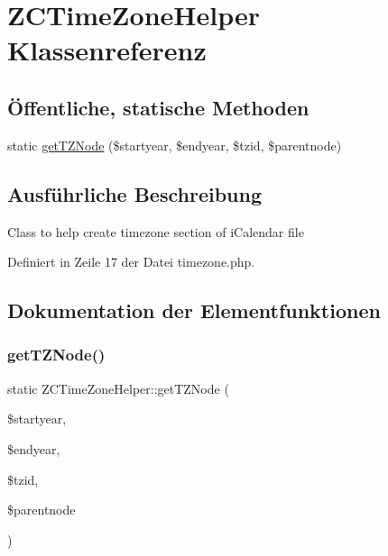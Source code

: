 \hypertarget{class_z_c_time_zone_helper}{}\section{Z\+C\+Time\+Zone\+Helper Klassenreferenz}
\label{class_z_c_time_zone_helper}
\subsection*{Öffentliche, statische Methoden}
\begin{DoxyCompactItemize}
\item 
static \mbox{\hyperlink{class_z_c_time_zone_helper_aec740d528e2da62a6a9781fa4f85208e}{get\+T\+Z\+Node}} (\$startyear, \$endyear, \$tzid, \$parentnode)
\end{DoxyCompactItemize}


\subsection{Ausführliche Beschreibung}
Class to help create timezone section of i\+Calendar file 

Definiert in Zeile 17 der Datei timezone.\+php.



\subsection{Dokumentation der Elementfunktionen}
\mbox{\label{class_z_c_time_zone_helper_aec740d528e2da62a6a9781fa4f85208e}} 
\subsubsection{\texorpdfstring{get\+T\+Z\+Node()}{getTZNode()}}
{\footnotesize\ttfamily static Z\+C\+Time\+Zone\+Helper\+::get\+T\+Z\+Node (\begin{DoxyParamCaption}\item[{}]{\$startyear,  }\item[{}]{\$endyear,  }\item[{}]{\$tzid,  }\item[{}]{\$parentnode }\end{DoxyParamCaption})\hspace{0.3cm}{\ttfamily [static]}}

